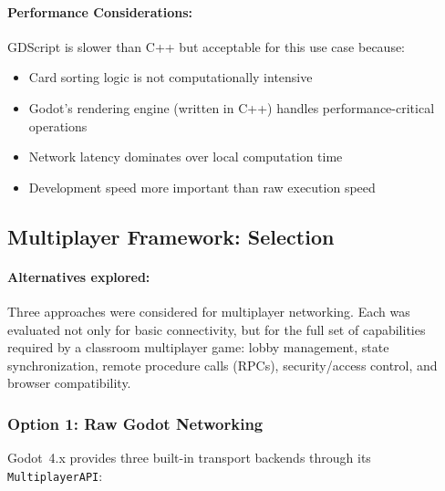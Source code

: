 \paragraph*{Performance Considerations:}

GDScript is slower than C++ but acceptable for this use case because:
\begin{itemize}
    \item Card sorting logic is not computationally intensive
    \item Godot's rendering engine (written in C++) handles performance-critical operations
    \item Network latency dominates over local computation time
    \item Development speed more important than raw execution speed
\end{itemize}

\subsection{Multiplayer Framework: Selection}
\label{subsec:gdsync-selection}

\paragraph*{Alternatives explored:}

Three approaches were considered for multiplayer networking. Each was evaluated not only for basic connectivity, but for the full set of capabilities required by a classroom multiplayer game: lobby management, state synchronization, remote procedure calls (RPCs), security/access control, and browser compatibility.

\subsubsection*{Option 1: Raw Godot Networking}

Godot~4.x provides three built-in transport backends through its \texttt{MultiplayerAPI}:

